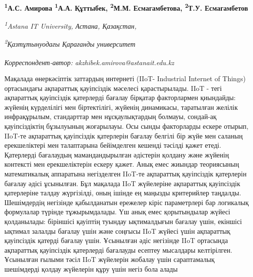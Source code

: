 
\begin{articleheader}

{\bfseries
\textsuperscript{1}А.С. Амирова\textsuperscript{\envelope } 
\textsuperscript{1}А.А. Құттыбек,
\textsuperscript{2}М.М. Есмагамбетова,
\textsuperscript{2}Т.У. Есмагамбетов}
\end{articleheader}

\begin{affiliation}
\emph{\textsuperscript{1}Astana IT University, Астана, Қазақстан,}

\emph{\textsuperscript{2}Қазтұтынуодағы Қарағанды университет}

\raggedright \textsuperscript{\envelope }{\em Корреспондент-автор: akzhibek.amirova@astanait.edu.kz}
\end{affiliation}

Мақалада өнеркәсіптік заттардың интернеті (IIoT- Industrial Internet of
Things) ортасындағы ақпараттық қауіпсіздік мәселесі қарастырылады. IIoT
- тегі ақпараттық қауіпсіздік қатерлерді бағалау бірқатар факторлармен
қиындайды: жүйенің күрделілігі мен біртектілігі, жүйенің динамикасы,
таратылған желілік инфрақұрылым, стандарттар мен нұсқаулықтардың
болмауы, сондай-ақ қауіпсіздіктің бұзылуының жоғарылауы. Осы сынды
факторларды ескере отырып, IIoT-те ақпараттық қауіпсіздік қатерлерін
бағалау белгілі бір жүйе мен саланың ерекшеліктері мен талаптарына
бейімделген кешенді тәсілді қажет етеді. Қатерлерді бағалаудың
мамандандырылған әдістерін қолдану және жүйенің контексті мен
ерекшеліктерін ескеру қажет. Анық емес жиындар теориясының математикалық
аппаратына негізделген IIoT-те ақпараттық қауіпсіздік қатерлерін бағалау
әдісі ұсынылған. Бұл мақалада IIoT жүйелеріне ақпараттық қауіпсіздік
қатерлеріне талдау жүргізілді, оның ішінде ең маңызды критерийлер
таңдалды. Шешімдердің негізінде қабылданатын ережелер кіріс параметрлері
бар логикалық формулалар түрінде тұжырымдалады. Үш анық емес
қорытындылар жүйесі қолданылады: біріншісі қауіптің туындау ықтималдығын
бағалау үшін, екіншісі ықтимал залалды бағалау үшін және соңғысы IIoT
жүйесі үшін ақпараттық қауіпсіздік қатерді бағалау үшін. Ұсынылған әдіс
негізінде IIoT ортасында ақпараттық қауіпсіздік қатерлерді бағалауды
есептеу мысалдары келтірілген. Ұсынылған ғылыми тәсіл IIoT жүйелерін
жобалау үшін сараптамалық шешімдерді қолдау жүйелерін құру үшін негіз
бола алады

